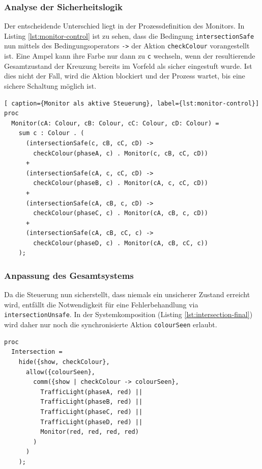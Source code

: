 \documentclass{article}
\begin{document}
\subsubsection{Analyse der Sicherheitslogik}
Der entscheidende Unterschied liegt in der Prozessdefinition des Monitors. In Listing \ref{lst:monitor-control} ist zu sehen, dass die Bedingung \texttt{intersectionSafe} nun mittels des Bedingungsoperators \texttt{->} der Aktion \texttt{checkColour} vorangestellt ist.  Eine Ampel kann ihre Farbe nur dann zu \texttt{c} wechseln, wenn der resultierende Gesamtzustand der Kreuzung bereits im Vorfeld als sicher eingestuft wurde. Ist dies nicht der Fall, wird die Aktion blockiert und der Prozess wartet, bis eine sichere Schaltung möglich ist.  
\begin{lstlisting}[ caption={Monitor als aktive Steuerung}, label={lst:monitor-control}]
proc
  Monitor(cA: Colour, cB: Colour, cC: Colour, cD: Colour) =
    sum c : Colour . (
      (intersectionSafe(c, cB, cC, cD) -> 
        checkColour(phaseA, c) . Monitor(c, cB, cC, cD))
      +   
      (intersectionSafe(cA, c, cC, cD) -> 
        checkColour(phaseB, c) . Monitor(cA, c, cC, cD))
      +   
      (intersectionSafe(cA, cB, c, cD) -> 
        checkColour(phaseC, c) . Monitor(cA, cB, c, cD))
      +   
      (intersectionSafe(cA, cB, cC, c) -> 
        checkColour(phaseD, c) . Monitor(cA, cB, cC, c))
    );
\end{lstlisting}

\subsubsection{Anpassung des Gesamtsystems}
Da die Steuerung nun sicherstellt, dass niemals ein unsicherer Zustand erreicht wird, entfällt die Notwendigkeit für eine Fehlerbehandlung via \texttt{intersectionUnsafe}. In der Systemkomposition (Listing \ref{lst:intersection-final}) wird daher nur noch die synchronisierte Aktion \texttt{colourSeen} erlaubt.  

\begin{lstlisting}[caption={Systemkomposition der koordinierten Steuerung}, label={lst:intersection-final}]
proc
  Intersection =
    hide({show, checkColour},
      allow({colourSeen},
        comm({show | checkColour -> colourSeen},
          TrafficLight(phaseA, red) ||
          TrafficLight(phaseB, red) ||
          TrafficLight(phaseC, red) ||
          TrafficLight(phaseD, red) ||
          Monitor(red, red, red, red)
        )
      )
    );
\end{lstlisting}
\end{document}
